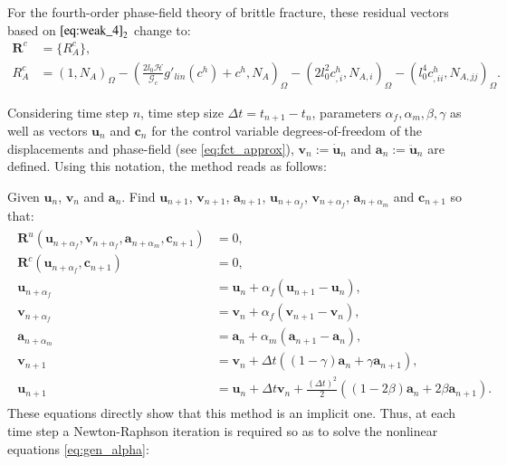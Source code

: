 For the fourth-order phase-field theory of brittle fracture, these residual vectors based on $\eqref{eq:weak_4}_{2}$ change to:
\begin{equation} \label{eq:res_vecs_c4}
	\begin{aligned}
		\mathbf{R}^{c}&=\{R_{A}^{c}\}, \\
		R_{A}^{c} &= \left(1,N_{A}\right)_{\Omega} - \left(\frac{2l_{0}\mathcal{H}}{\mathcal{G}_{c}}g'_{lin}\left(c^{h}\right) + c^{h},N_{A}\right)_{\Omega} - \left(2l_{0}^{2}c^{h}_{,i},N_{A,i}\right)_{\Omega} - \left(l_{0}^{4}c^{h}_{,ii},N_{A,jj}\right)_{\Omega}.
	\end{aligned}
\end{equation}


Considering time step $n$, time step size $\Delta t = t_{n+1}-t_{n}$, parameters $\alpha_{f},\alpha_{m},\beta,\gamma$ as well as vectors $\mathbf{u}_{n}$ and $\mathbf{c}_{n}$ for the control variable degrees-of-freedom of the displacements and phase-field (see \eqref{eq:fct_approx}), $\textbf{v}_{n}:=\dot{\mathbf{u}}_{n}$ and $\mathbf{a}_{n}:=\ddot{\mathbf{u}}_{n}$ are defined. Using this notation, the method reads as follows:

Given $\mathbf{u}_{n}$, $\mathbf{v}_{n}$ and $\mathbf{a}_{n}$. Find $\mathbf{u}_{n+1}$, $\mathbf{v}_{n+1}$, $\mathbf{a}_{n+1}$, $\mathbf{u}_{n+\alpha_{f}}$, $\mathbf{v}_{n+\alpha_{f}}$, $\mathbf{a}_{n+\alpha_{m}}$ and $\mathbf{c}_{n+1}$ so that:
\begin{equation} \label{eq:gen_alpha}
\begin{aligned}
\begin{alignedat}{1}
        \mathbf{R}^{u}\left(\mathbf{u}_{n+\alpha_{f}},\mathbf{v}_{n+\alpha_{f}},\mathbf{a}_{n+\alpha_{m}},\mathbf{c}_{n+1}\right) &= 0, \\
    	\mathbf{R}^{c}\left(\mathbf{u}_{n+\alpha_{f}},\mathbf{c}_{n+1}\right) &= 0, \\
        \mathbf{u}_{n+\alpha_{f}} &= \mathbf{u}_{n}+\alpha_{f}\left(\mathbf{u}_{n+1}-\mathbf{u}_{n}\right), \\      
        \mathbf{v}_{n+\alpha_{f}} &= \mathbf{v}_{n}+\alpha_{f}\left(\mathbf{v}_{n+1}-\mathbf{v}_{n}\right), \\
        \mathbf{a}_{n+\alpha_{m}} &= \mathbf{a}_{n}+\alpha_{m}\left(\mathbf{a}_{n+1}-\mathbf{a}_{n}\right), \\
        \mathbf{v}_{n+1} &= \mathbf{v}_{n}+\Delta t\left(\left(1-\gamma\right)\mathbf{a}_{n}+\gamma\mathbf{a}_{n+1}\right), \\  
        \mathbf{u}_{n+1} &= \mathbf{u}_{n}+\Delta t\mathbf{v}_{n}+\frac{\left(\Delta t\right)^{2}}{2}\left(\left(1-2\beta\right)\mathbf{a}_{n}+2\beta\mathbf{a}_{n+1}\right).
\end{alignedat}
\end{aligned}
\end{equation}
These equations directly show that this method is an implicit one. Thus, at each time step a Newton-Raphson iteration is required so as to solve the nonlinear equations \eqref{eq:gen_alpha}:

